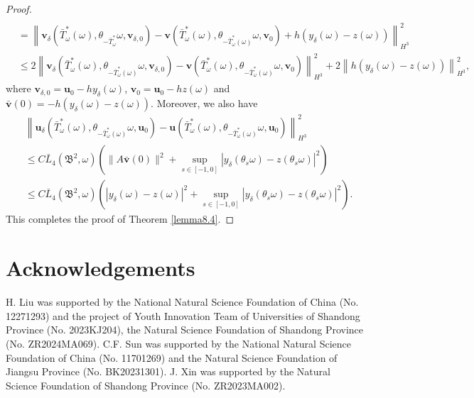 \documentclass{elsarticle}
\theoremstyle{definition}
\numberwithin{equation}{section}
\begin{document}
\begin{proof}
\begin{align*}
 \nonumber\\
& =\left \| \textbf{v}_\delta \! \left (\bar{T}_\omega^* (\omega) ,\theta_{-\bar{T}_\omega^*}\omega,  \textbf{v}_{\delta,0}\right)
 - \textbf{v} \! \left ( \bar{T}_\omega^* (\omega) ,\theta_{-\bar{T}_\omega^*(\omega)}\omega, \textbf{v}_{0}\right)+h(y_\delta(\omega)-z(\omega)) \right \|^2_{H^3}\nonumber\\
&\leq 2\left \| \textbf{v}_\delta \! \left ( \bar{T}_\omega^* (\omega) ,\theta_{-\bar{T}_\omega^*(\omega)}\omega,  \textbf{v}_{\delta,0}\right)
 - \textbf{v} \! \left ( \bar{T}_\omega^* (\omega) ,\theta_{-\bar{T}_\omega^*(\omega)}\omega, \textbf{v}_{0}\right)\right\|^2_{H^3}+2\left\|h\left (y_\delta(\omega)-z(\omega)\right ) \right \|^2_{H^3},
\end{align*}
where $\textbf{v}_{\delta,0}=\textbf{u}_0-hy_\delta(\omega)$, $\textbf{v}_{0}=\textbf{u}_0-hz(\omega)$  and $\bar{\textbf{v}}(0)=-h(y_\delta(\omega)-z(\omega))$. Moreover, we also have
\begin{align*}
&\left \| \textbf{u}_\delta \! \left ( \bar{T}_\omega^* (\omega) ,\theta_{-\bar{T}_\omega^*(\omega)}\omega,  \textbf{u}_{0}\right)
 - \textbf{u} \! \left ( \bar{T}_\omega^*(\omega) ,\theta_{-\bar{T}_\omega^*(\omega)}\omega, \textbf{u}_{0}\right) \right \|^2_{H^3}\nonumber\\
 &\leq C\bar{L}_4({\mathfrak B^2}, \omega)\left (\|A\bar{\textbf{v}}(0)\|^2+\sup\limits_{s\in[-1,0]}|y_\delta(\theta_s\omega)-z(\theta_s\omega)|^2\right )\nonumber\\
 &\leq C\bar{L}_4({\mathfrak B^2}, \omega)\left (|y_\delta(\omega)-z(\omega)|^2+\sup\limits_{s\in[-1,0]}|y_\delta(\theta_s\omega)-z(\theta_s\omega)|^2\right ).
\end{align*}
This completes the proof of Theorem \ref{lemma8.4}.
\end{proof}







\section*{Acknowledgements}
  H. Liu was supported by the National Natural Science Foundation of China (No. 12271293) and the project of Youth Innovation Team of Universities of Shandong Province (No. 2023KJ204), the Natural Science Foundation of Shandong Province (No. ZR2024MA069).  C.F. Sun was supported by the National Natural Science Foundation of China (No. 11701269) and the Natural Science Foundation of Jiangsu Province (No. BK20231301). J. Xin was supported  by the Natural Science Foundation of Shandong Province (No. ZR2023MA002).
\end{document}
